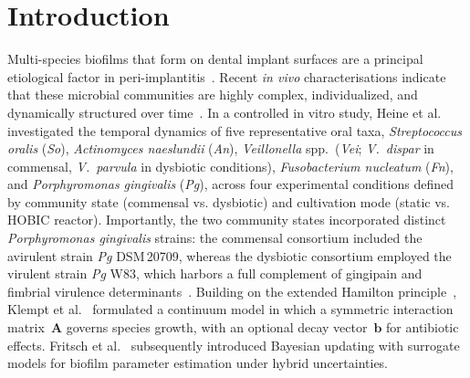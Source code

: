 \documentclass[pdflatex,sn-mathphys-num,lineno]{sn-jnl}
\begin{document}

\maketitle


\section{Introduction}
\label{sec:intro}

Multi-species biofilms that form on dental implant surfaces are a principal etiological factor in peri-implantitis~\cite{Kolenbrander2010OralMultispecies, Marsh2003Dental}. Recent \textit{in vivo} characterisations indicate that these microbial communities are highly complex, individualized, and dynamically structured over time~\cite{dieckow2024structure, cui2025microbial}.
In a controlled in vitro study, Heine et al.~\cite{heine2025influence} investigated the temporal dynamics of five representative oral taxa, \textit{Streptococcus oralis} (\textit{So}), \textit{Actinomyces naeslundii} (\textit{An}), \textit{Veillonella} spp.\ (\textit{Vei}; \textit{V.~dispar} in commensal, \textit{V.~parvula} in dysbiotic conditions), \textit{Fusobacterium nucleatum} (\textit{Fn}), and \textit{Porphyromonas gingivalis} (\textit{Pg}), across four experimental conditions defined by community state (commensal vs. dysbiotic) and cultivation mode (static vs. HOBIC reactor).
Importantly, the two community states incorporated distinct \textit{Porphyromonas gingivalis} strains: the commensal consortium included the avirulent strain \textit{Pg} DSM\,20709, whereas the dysbiotic consortium employed the virulent strain \textit{Pg} W83, which harbors a full complement of gingipain and fimbrial virulence determinants~\cite{heine2025influence}.
Building on the extended Hamilton principle~\cite{JunkerBalzani2021ExtendedHamilton}, Klempt et al.~\cite{Klempt2025ContinuumBiofilm} formulated a continuum model in which a symmetric interaction matrix~$\mathbf{A}$ governs species growth, with an optional decay vector~$\mathbf{b}$ for antibiotic effects.
Fritsch et al.~\cite{Fritsch2025BayesianMicrofilms} subsequently introduced Bayesian updating with surrogate models for biofilm parameter estimation under hybrid uncertainties.
\end{document}
